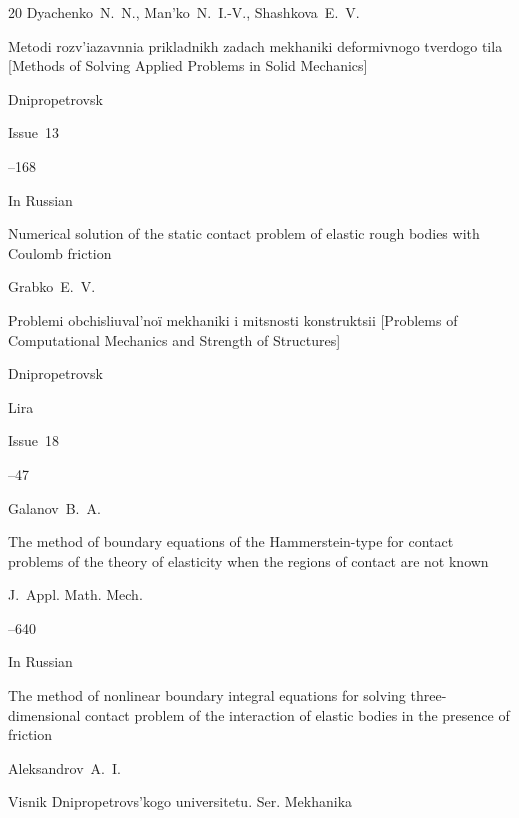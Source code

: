 \begin{thebibliography}{20}
\by Dyachenko~N.~N., Man'ko~N.~I.-V., Shashkova~E.~V.

\inbook Metodi rozv'iazavnnia prikladnikh zadach mekhaniki deformivnogo tverdogo tila \rm [Methods of Solving Applied Problems in Solid Mechanics]

\publaddr Dnipropetrovsk


\issueinfo Issue~13

--168




\lang In Russian

\paper Numerical solution of the static contact problem of elastic rough bodies with Coulomb friction

\by Grabko~E.~V.

\serial Problemi obchisliuval'no\"i mekhaniki i mitsnosti konstruktsii \rm [Problems of Computational Mechanics and Strength of Structures]

\publaddr Dnipropetrovsk

\publ Lira


\volinfo Issue~18

--47




\by Galanov~B.~A.

\paper The method of boundary equations of the Hammerstein-type for contact problems of the theory of elasticity when the regions of contact are not known

\jour J.~Appl. Math. Mech. 



--640 








\lang In Russian 

\paper The method of nonlinear boundary integral equations for solving three-dimensional contact problem of the interaction of elastic bodies in the presence of friction

\by Aleksandrov~A.~I.

\jour Visnik Dnipropetrovs'kogo universitetu. Ser. Mekhanika


\end{thebibliography}
